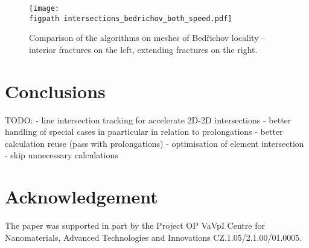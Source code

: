 \documentclass{elsarticle}
\newcommand{\figpath}{figures/}
\begin{document}
\begin{figure}[!htb]
    \centering
    \texttt{[image: \\figpath intersections\_bedrichov\_both\_speed.pdf]}
    \caption{Comparison of the algorithms on meshes of Bed{\v r}ichov locality -- interior fractures on the left,
             extending fractures on the right.}
    \label{fig:bedrichov_speed}
\end{figure}





\section{Conclusions}
TODO:
- line intersection tracking for accelerate 2D-2D intersections
- better handling of special cases in paarticular in relation to prolongations
- better calculation reuse (pass with prolongations)
- optimisation of element intersection - skip unnecessary calculations
\section{Acknowledgement}
The paper was supported in part by the Project OP
VaVpI Centre for Nanomaterials, Advanced Technologies  and Innovations
CZ.1.05/2.1.00/01.0005.






% 
% 
% 
  
 
\end{document}

